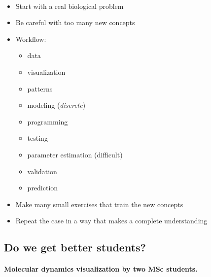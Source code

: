 \documentclass[%
twoside,                 %
final,                   %
10pt]{article}
\begin{document}
\paragraph{}
\begin{itemize}
 \item Start with a real biological problem

 \item Be careful with too many new concepts

 \item Workflow:
\begin{itemize}

  \item data

  \item visualization

  \item patterns

  \item modeling (\emph{discrete})

  \item programming

  \item testing

  \item parameter estimation (difficult)

  \item validation

  \item prediction

\end{itemize}

\noindent
 \item Make many small exercises that train the new concepts

 \item Repeat the case in a way that makes a complete understanding
\end{itemize}

\noindent




\subsection{Do we get better students?}

\paragraph{Molecular dynamics visualization by two MSc students.}
\end{document}
